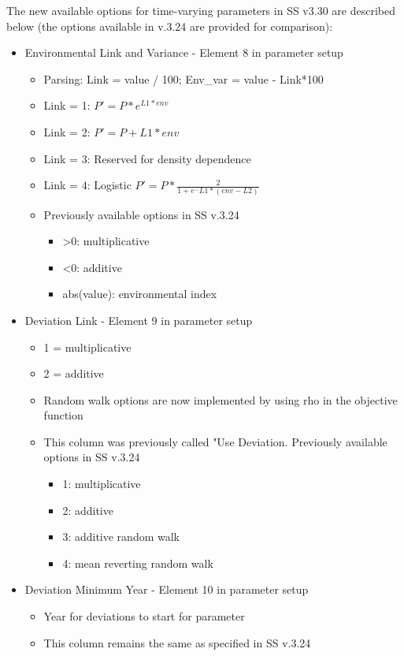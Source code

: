 The new available options for time-varying parameters in SS v3.30 are described below (the options available in v.3.24 are provided for comparison):
\begin{itemize}
	\item Environmental Link and  Variance - Element 8 in parameter setup
		\begin{itemize}
			\item Parsing: Link = value / 100; Env\_var = value - Link*100
			\item Link = 1: $P'=P*e^{L1*env}$
			\item Link = 2: $P'=P+L1*env$
			\item Link = 3: Reserved for density dependence
			\item Link = 4: Logistic $P'=P*\frac{2}{1+e^-L1*(env-L2)}$
			\item Previously available options in SS v.3.24
			\begin{itemize}
				\item >0: multiplicative
				\item <0: additive
				\item abs(value): environmental index
			\end{itemize}
		\end{itemize}
	\item Deviation Link - Element 9 in parameter setup
	\begin{itemize}
		\item 1 = multiplicative
		\item 2 = additive
		\item Random walk options are now implemented by using rho in the objective function
		\item This column was previously called "Use Deviation. Previously available options in SS v.3.24
		\begin{itemize}
			\item 1: multiplicative
			\item 2: additive
			\item 3: additive random walk
			\item 4: mean reverting random walk
		\end{itemize}
	\end{itemize}
	\item Deviation  Minimum Year - Element 10 in parameter setup
		\begin{itemize}
			\item Year for deviations to start for parameter
			\item This column remains the same as specified in SS v.3.24

\end{itemize}
\end{itemize}
